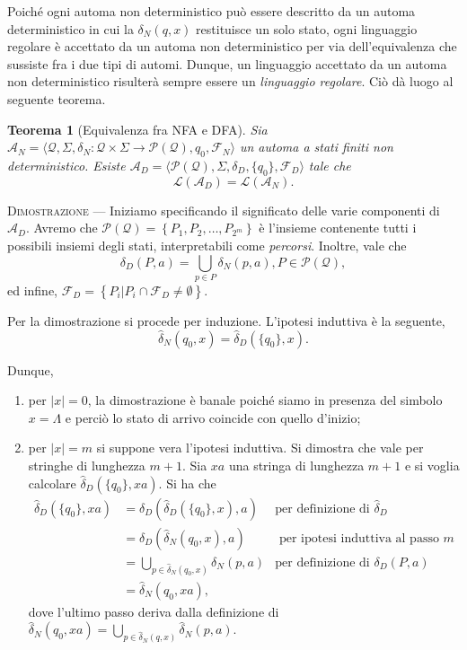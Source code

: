\documentclass[10pt]{\classname}
\theoremstyle{newlinethm}
\newtheorem{thm}{Teorema}[section]
\theoremstyle{theorem}
\theoremstyle{definition}
\theoremstyle{definition}
\theoremstyle{definition}
\theoremstyle{definition}
\begin{document}
\clearpage

Poiché ogni automa non deterministico può essere descritto da un automa
deterministico in cui la $\delta_N(q, x)$ restituisce un solo stato, ogni
linguaggio regolare è accettato da un automa non deterministico per via
dell'equivalenza che sussiste fra i due tipi di automi. Dunque, un linguaggio
accettato da un automa non deterministico risulterà sempre essere
un \emph{linguaggio regolare}. Ciò dà luogo al seguente teorema.

\begin{thm}[Equivalenza fra NFA e DFA]
    Sia $\mathcal A_N = \langle \mathcal Q, \Sigma, \delta_N : \mathcal Q \times \Sigma \rightarrow \mathcal P ( \mathcal Q ), q_0, \mathcal F_N \rangle$ un automa a stati finiti non deterministico. Esiste $\mathcal A_D = \langle \mathcal P ( \mathcal Q ), \Sigma, \delta_D, \{q_0\}, \mathcal F_D \rangle$ tale che \[\mathcal L (\mathcal A_D) = \mathcal L (\mathcal A_N).\]
\end{thm}

\textsc{Dimostrazione} --- Iniziamo specificando il significato delle varie componenti di $\mathcal A_D$. Avremo che $\mathcal P (\mathcal Q) = \left\{P_1, P_2, \dots, P_{2^m}\right\}$ è l'insieme contenente tutti i possibili insiemi degli stati, interpretabili come \emph{percorsi}. Inoltre, vale che \[\delta_D (P, a) = \bigcup_{p \in P} \delta_N(p, a), P \in \mathcal P ( \mathcal Q),\] ed infine, $\mathcal F_D = \left\{P_i | P_i \cap \mathcal F_D \neq \emptyset\right\}$.

Per la dimostrazione si procede per induzione. L'ipotesi induttiva è la seguente, \[\hat \delta_N (q_0, x) = \hat \delta_D(\{q_0\}, x).\]

Dunque,
\begin{enumerate}
    \item per $|x|=0$, la dimostrazione è banale poiché siamo in presenza del simbolo $x=\Lambda$ e perciò lo stato di arrivo coincide con quello d'inizio;
    \item per $|x| = m$ si suppone vera l'ipotesi induttiva. Si dimostra che vale per stringhe di lunghezza $m+1$. Sia $xa$ una stringa di lunghezza $m + 1$ e si voglia calcolare $\hat \delta_D(\{q_0\}, xa).$ Si ha che
        \begin{align*}
            \hat\delta_D(\{q_0\}, xa) &= \delta_D(\hat\delta_D(\{q_0\}, x), a) & \mbox{per definizione di }\hat\delta_D \\
                                      &= \delta_D(\hat\delta_N(q_0, x), a) & \mbox{ per ipotesi induttiva al passo } m\\
                                      &= \bigcup_{p\in\hat\delta_N(q_0, x)} \delta_N(p, a) & \mbox{per definizione di } \delta_D(P,a)\\
                                      &= \hat\delta_N(q_0, xa), &
        \end{align*}
        dove l'ultimo passo deriva dalla definizione di $\hat\delta_N(q_0, xa) = \bigcup_{p \in \hat\delta_N(q, x)} \hat\delta_N (p, a)$.
\end{enumerate}
\end{document}
